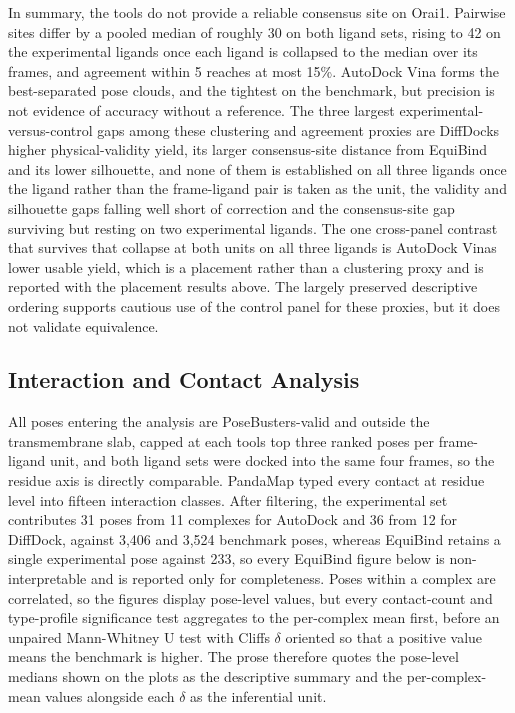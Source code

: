 In summary, the tools do not provide a reliable consensus site on Orai1. Pairwise sites differ by a pooled median of roughly 30 \angstrom{} on both ligand sets, rising to 42 \angstrom{} on the experimental ligands once each ligand is collapsed to the median over its frames, and agreement within 5 \angstrom{} reaches at most 15\%. AutoDock Vina forms the best-separated pose clouds, and the tightest on the benchmark, but precision is not evidence of accuracy without a reference. The three largest experimental-versus-control gaps among these clustering and agreement proxies are DiffDock\textquotesingle s higher physical-validity yield, its larger consensus-site distance from EquiBind and its lower silhouette, and none of them is established on all three ligands once the ligand rather than the frame-ligand pair is taken as the unit, the validity and silhouette gaps falling well short of correction and the consensus-site gap surviving but resting on two experimental ligands. The one cross-panel contrast that survives that collapse at both units on all three ligands is AutoDock Vina\textquotesingle s lower usable yield, which is a placement rather than a clustering proxy and is reported with the placement results above. The largely preserved descriptive ordering supports cautious use of the control panel for these proxies, but it does not validate equivalence.

\protect\hypertarget{_Toc235735939}{}{}

\hypertarget{interaction-and-contact-analysis-1}{%
\subsection{Interaction and Contact Analysis}\label{interaction-and-contact-analysis-1}}

All poses entering the analysis are PoseBusters-valid and outside the transmembrane slab, capped at each tool\textquotesingle s top three ranked poses per frame-ligand unit, and both ligand sets were docked into the same four frames, so the residue axis is directly comparable. PandaMap typed every contact at residue level into fifteen interaction classes. After filtering, the experimental set contributes 31 poses from 11 complexes for AutoDock and 36 from 12 for DiffDock, against 3,406 and 3,524 benchmark poses, whereas EquiBind retains a single experimental pose against 233, so every EquiBind figure below is non-interpretable and is reported only for completeness. Poses within a complex are correlated, so the figures display pose-level values, but every contact-count and type-profile significance test aggregates to the per-complex mean first, before an unpaired Mann-Whitney U test with Cliff\textquotesingle s \ensuremath{\delta} oriented so that a positive value means the benchmark is higher. The prose therefore quotes the pose-level medians shown on the plots as the descriptive summary and the per-complex-mean values alongside each \ensuremath{\delta} as the inferential unit.

